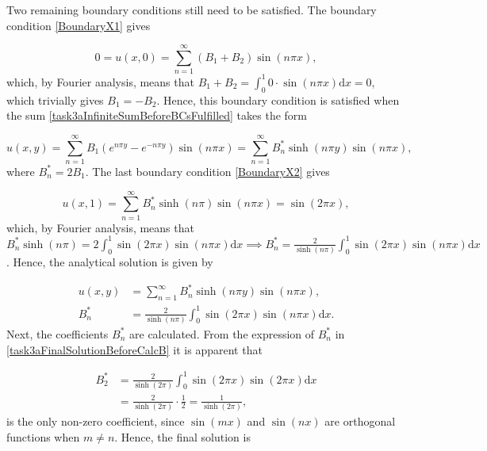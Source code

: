 Two remaining boundary conditions still need to be satisfied. The boundary condition \eqref{BoundaryX1} gives 

\begin{equation*}
    0 = u(x,0) = \sum_{n=1}^\infty (B_1 + B_2)\sin{(n\pi x)}, 
\end{equation*}
which, by Fourier analysis, means that $B_1 + B_2 = \int_0^1 0\cdot \sin(n\pi x) \mathrm{d}x = 0$, which trivially gives $B_1 = -B_2$. Hence, this boundary condition is satisfied when the sum \eqref{task3aInfiniteSumBeforeBCsFulfilled} takes the form

\begin{equation*}
    u(x,y) = \sum_{n=1}^\infty B_1(e^{n\pi y} - e^{-n\pi y})\sin{(n\pi x)} = \sum_{n=1}^\infty B^*_n\sinh{(n\pi y)}\sin{(n\pi x)}, 
\end{equation*}
where $B^*_n = 2B_1$. The last boundary condition \eqref{BoundaryX2} gives

\begin{equation*}
    u(x,1) = \sum_{n=1}^\infty B^*_n\sinh{(n\pi)}\sin{(n\pi x)} = \sin{(2\pi x)}, 
\end{equation*}
which, by Fourier analysis, means that $B^*_n\sinh{(n\pi)}= 2\int_0^1\sin{(2\pi x)}\sin(n\pi x)\mathrm{d}x \implies B^*_n = \frac{2}{\sinh{(n\pi)}} \int_0^1\sin{(2\pi x)}\sin(n\pi x)\mathrm{d}x$. Hence, the analytical solution is given by

\begin{equation}
\begin{split}
    u(x,y) &= \sum_{n=1}^\infty B^*_n\sinh{(n\pi y)}\sin{(n\pi x)}, \\
     B^*_n &= \frac{2}{\sinh{(n\pi)}} \int_0^1\sin{(2\pi x)}\sin(n\pi x)\mathrm{d}x.
\end{split}
\label{task3aFinalSolutionBeforeCalcB}
\end{equation}
Next, the coefficients $B^*_n$ are calculated. From the expression of $B^*_n$ in \eqref{task3aFinalSolutionBeforeCalcB} it is apparent that

\begin{equation*}
\begin{split}
    B^*_2 &= \frac{2}{\sinh{(2\pi)}} \int_0^1\sin{(2\pi x)}\sin(2\pi x)\mathrm{d}x \\ 
    &= \frac{2}{\sinh{(2\pi)}} \cdot \frac12 = \frac{1}{\sinh{(2\pi)}}, 
\end{split}
\end{equation*}
is the only non-zero coefficient, since $\sin{(mx)}$ and $\sin{(nx)}$ are orthogonal functions when $m \neq n$. Hence, the final solution is 

